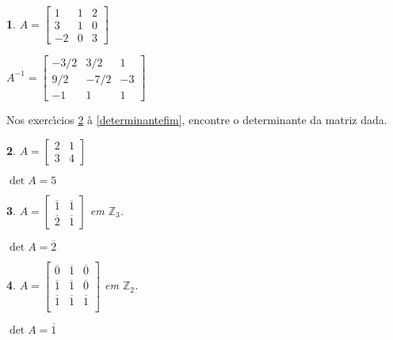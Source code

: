 \documentclass[12pt]{exam}
\newtheorem{exercicio}{}
\newcommand{\integer}{\mathbb{Z}}
\begin{document}
\begin{exercicio}\label{matrizinversafim}
$A =\begin{bmatrix}
    1 & 1 & 2\\
    3 & 1 & 0\\
    -2 & 0 & 3
  \end{bmatrix}$
\begin{solucao}
  $A^{-1} =\begin{bmatrix}
    -3/2 & 3/2 & 1\\
    9/2 & -7/2 & -3\\
    -1 & 1 & 1
  \end{bmatrix}$
\end{solucao}
\end{exercicio}

Nos exerc{\'\i}cios \ref{determinanteinicio} \`a \ref{determinantefim}, encontre o determinante da matriz dada.

\begin{exercicio}\label{determinanteinicio}
$A = \begin{bmatrix}
    2 & 1\\
    3 & 4
    \end{bmatrix}$
\begin{solucao}
  $\det A = 5$
\end{solucao}
\end{exercicio}

\begin{exercicio}
$A = \begin{bmatrix}
    \overline{1} & \overline{1}\\
    \overline{2} & \overline{1}
    \end{bmatrix}$ em $\integer_3$.
\begin{solucao}
  $\det A = \overline{2}$
\end{solucao}
\end{exercicio}

\begin{exercicio}
$A = \begin{bmatrix}
    \overline{0} & \overline{1} & \overline{0}\\
    \overline{1} & \overline{1} & \overline{0}\\
    \overline{1} & \overline{1} & \overline{1}\\
    \end{bmatrix}$ em $\integer_2$.
\begin{solucao}
  $\det A = \overline{1}$
\end{solucao}
\end{exercicio}
\end{document}

